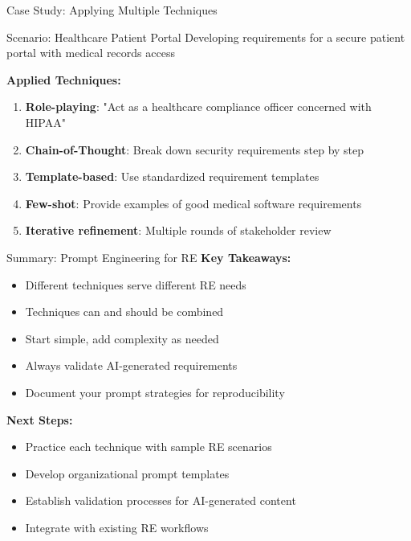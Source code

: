 \documentclass{beamer}
\begin{document}
\begin{frame}[t]{Case Study: Applying Multiple Techniques}
    \begin{block}{Scenario: Healthcare Patient Portal}
        Developing requirements for a secure patient portal with medical records access
    \end{block}
    
    \textbf{Applied Techniques:}
    \begin{enumerate}
        \item \textbf{Role-playing}: "Act as a healthcare compliance officer concerned with HIPAA"
        \item \textbf{Chain-of-Thought}: Break down security requirements step by step
        \item \textbf{Template-based}: Use standardized requirement templates
        \item \textbf{Few-shot}: Provide examples of good medical software requirements
        \item \textbf{Iterative refinement}: Multiple rounds of stakeholder review
    \end{enumerate}
    
\end{frame}

\begin{frame}[t]{Summary: Prompt Engineering for RE}
            \textbf{Key Takeaways:}
            \begin{itemize}
                \item Different techniques serve different RE needs
                \item Techniques can and should be combined
                \item Start simple, add complexity as needed
                \item Always validate AI-generated requirements
                \item Document your prompt strategies for reproducibility
            \end{itemize}
    
    \vspace{0.5cm}
    \textbf{Next Steps:}
    \begin{itemize}
        \item Practice each technique with sample RE scenarios
        \item Develop organizational prompt templates
        \item Establish validation processes for AI-generated content
        \item Integrate with existing RE workflows
    \end{itemize}
\end{frame}
\end{document}
